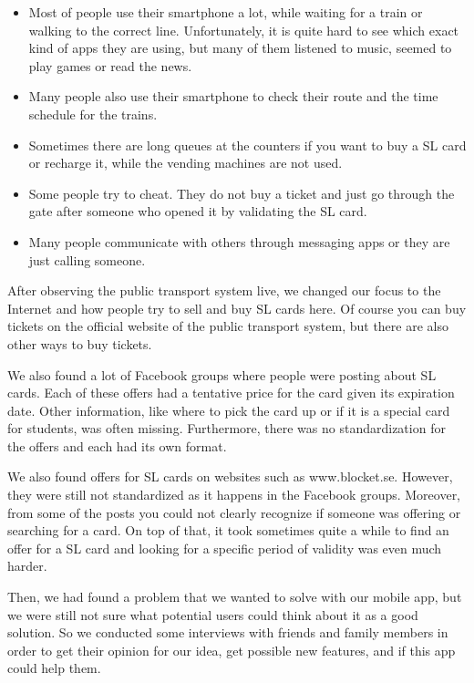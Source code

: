 \documentclass[11pt,twoside,a4paper]{report}
\begin{document}
\begin{itemize}
	\item Most of people use their smartphone a lot, while waiting for a train or walking to the correct line. Unfortunately, it is quite hard to see which exact kind of apps they are using, but many of them listened to music, seemed to play games or read the news.
	\item Many people also use their smartphone to check their route and the time schedule for the trains.
	\item Sometimes there are long queues at the counters if you want to buy a SL card or recharge it, while the vending machines are not used.
	\item Some people try to cheat. They do not buy a ticket and just go through the gate after someone who opened it by validating the SL card.
	\item Many people communicate with others through messaging apps or they are just calling someone.
\end{itemize}

After observing the public transport system live, we changed our focus to the Internet and how people try to sell and buy SL cards here. Of course you can buy tickets on the official website of the public transport system, but there are also other ways to buy tickets.

We also found a lot of Facebook groups where people were posting about SL cards. Each of these offers had a tentative price for the card given its expiration date. Other information, like where to pick the card up or if it is a special card for students, was often missing. Furthermore, there was no standardization for the offers and each had its own format.

We also found offers for SL cards on websites such as www.blocket.se. However, they were still not standardized as it happens in the Facebook groups. Moreover, from some of the posts you could not clearly recognize if someone was offering or searching for a card. On top of that, it took sometimes quite a while to find an offer for a SL card and looking for a specific period of validity was even much harder.

Then, we had found a problem that we wanted to solve with our mobile app, but we were still not sure what potential users could think about it as a good solution. So we conducted some interviews with friends and family members in order to get their opinion for our idea, get possible new features, and if this app could help them.
\end{document}
